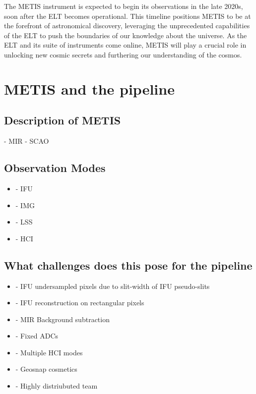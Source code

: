 \documentclass[a4paper]{spie}  %
\begin{document}
The METIS instrument is expected to begin its observations in the late 2020s, soon after the ELT becomes operational. This timeline positions METIS to be at the forefront of astronomical discovery, leveraging the unprecedented capabilities of the ELT to push the boundaries of our knowledge about the universe. As the ELT and its suite of instruments come online, METIS will play a crucial role in unlocking new cosmic secrets and furthering our understanding of the cosmos.





\section{METIS and the pipeline}
\label{sec:environment}

\subsection{Description of METIS}
\label{ssec:env_metis}
	- MIR
	- SCAO
\subsection{Observation Modes}
\label{ssec:env_modes}
 \begin{itemize}
     \item - IFU
     \item - IMG
     \item - LSS
     \item - HCI
 \end{itemize}
 
\subsection{What challenges does this pose for the pipeline}
\label{ssec:env_challenges}

\begin{itemize}
    \item - IFU undersampled pixels due to slit-width of IFU pseudo-slits
    \item - IFU reconstruction on rectangular pixels
    \item - MIR Background subtraction
    \item - Fixed ADCs
    \item - Multiple HCI modes
    \item - Geosnap cosmetics
    \item - Highly distriubuted team

\end{itemize}
\end{document}
